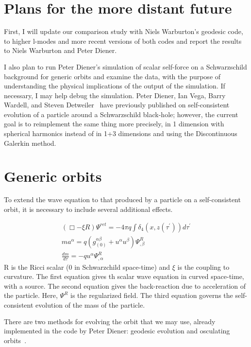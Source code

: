\section{Plans for the more distant future}
First, I will update our comparison study with Niels Warburton's geodesic code, to higher l-modes and more recent versions of both codes and report the results to Niels Warburton and Peter Diener.  

I also plan to run Peter Diener's simulation of scalar self-force on a Schwarzschild background for generic orbits and examine the data, with the purpose of understanding the physical implications of the output of the simulation. If necessary, I may help debug the simulation. Peter Diener, Ian Vega, Barry Wardell, and Steven Detweiler~\cite{diener_vega_wardell_detweiler_2012} have previously published on self-consistent evolution of a particle around a Schwarzschild black-hole; however, the current goal is to reimplement the same thing more precisely, in 1 dimension with spherical harmonics instead of in 1+3 dimensions and using the Discontinuous Galerkin method. 

\section{Generic orbits}
To extend the wave equation to that produced by a particle on a self-consistent orbit, it is necessary to include several additional effects.

\begin{eqnarray}
  (\Box - \xi R)\Psi^{ret} = -4\pi q \int\delta_4(x,z(\tau^\prime))d\tau^\prime\\
    ma^\alpha=q(g^{\alpha\beta}_{(0)}+u^\alpha u^\beta)\Psi^{R}_{,\beta}\\
    \frac{dm}{d\tau}=-q u^\alpha\Psi^R_{,\alpha}
    \label{genericev}
\end{eqnarray}
R is the Ricci scalar (0 in Schwarzchild space-time) and $\xi$ is the coupling to curvature. The first equation gives th scalar wave equation in curved space-time, with a source. The second equation gives the back-reaction due to acceleration of the particle. Here, $\Psi^R$ is the regularized field. The third equation governs the self-consistent evolution of the mass of the particle.~\cite{WardellSelfForceReview}

There are two methods for evolving the orbit that we may use, already implemented in the code by Peter Diener: geodesic evolution and osculating orbits~\cite{pound_poisson}.

